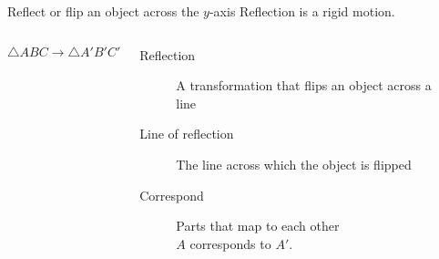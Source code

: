 \documentclass[onlytextwidth, aspectratio=169]{beamer}
\begin{document}
\begin{frame}{Reflect or flip an object across the $y$-axis}
  {Reflection is a rigid motion.}
  \begin{columns}
    $$\triangle ABC \rightarrow \triangle A'B'C'$$
      \begin{description}
        \item[Reflection] A transformation that flips an object across a line
        \item[Line of reflection] The line across which the object is flipped
        \item[Correspond] Parts that map to each other \\
        $A$ corresponds to $A'$.
      \end{description}
      
    \begin{flushright}
    \end{flushright}
  \end{columns}
\end{frame}
\end{document}
